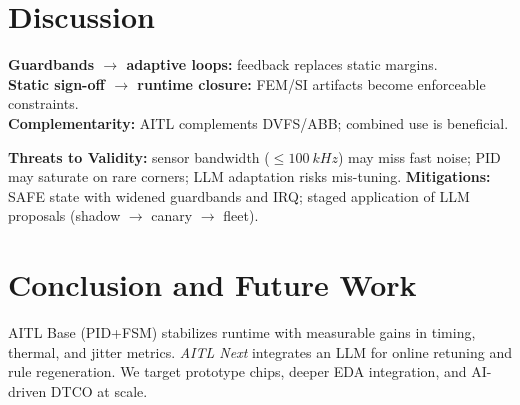 \documentclass[conference]{IEEEtran}
\begin{document}
\section{Discussion}
\textbf{Guardbands $\rightarrow$ adaptive loops:} feedback replaces static margins.\\
\textbf{Static sign-off $\rightarrow$ runtime closure:} FEM/SI artifacts become enforceable constraints.\\
\textbf{Complementarity:} AITL complements DVFS/ABB; combined use is beneficial.

\textbf{Threats to Validity:} sensor bandwidth ($\leq\SI{100}{kHz}$) may miss fast noise; PID may saturate on rare corners; LLM adaptation risks mis-tuning. \textbf{Mitigations:} SAFE state with widened guardbands and IRQ; staged application of LLM proposals (shadow $\rightarrow$ canary $\rightarrow$ fleet).

\section{Conclusion and Future Work}
AITL Base (PID+FSM) stabilizes runtime with measurable gains in timing, thermal, and jitter metrics. \emph{AITL Next} integrates an LLM for online retuning and rule regeneration. We target prototype chips, deeper EDA integration, and AI-driven DTCO at scale.
\end{document}
